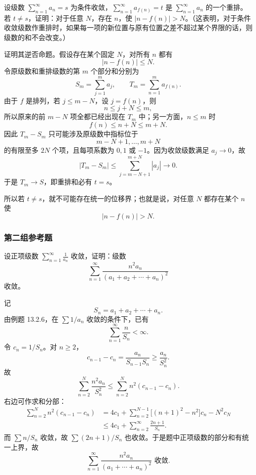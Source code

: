 \begin{xreferenceproblem}[20]
设级数 $\sum_{n=1}^{\infty}a_n=s$ 为条件收敛，$\sum_{n=1}^{\infty}a_{f(n)}=t$ 是 $\sum_{n=1}^{\infty}a_n$ 的一个重排。若 $t\neq s$，证明：对于任意 $N$，存在 $n$，使 $|n-f(n)|>N$。（这表明，对于条件收敛级数作重排时，如果每一项的新位置与原有位置之差不超过某个界限的话，则级数的和不会改变。）
\end{xreferenceproblem}
\begin{xsolution}
证明其逆否命题。假设存在某个固定 $N$，对所有 $n$ 都有
\[
 |n-f(n)|\leq N.
\]
令原级数和重排级数的第 $m$ 个部分和分别为
\[
 S_m=\sum_{j=1}^{m}a_j,
 \qquad
 T_m=\sum_{n=1}^{m}a_{f(n)}.
\]
由于 $f$ 是排列，若 $j\leq m-N$，设 $j=f(n)$，则
\[
 n\leq j+N\leq m,
\]
所以原来的前 $m-N$ 项全都已经出现在 $T_m$ 中；另一方面，$n\leq m$ 时
\[
 f(n)\leq n+N\leq m+N.
\]
因此 $T_m-S_m$ 只可能涉及原级数中指标位于
\[
 m-N+1,\ldots,m+N
\]
的有限至多 $2N$ 个项，且每项系数为 $0,1$ 或 $-1$。因为收敛级数满足 $a_j\to0$，故
\[
 |T_m-S_m|\leq\sum_{j=m-N+1}^{m+N}|a_j|\longrightarrow0.
\]
于是 $T_m\to S$，即重排和必有 $t=s$。

所以若 $t\neq s$，就不可能存在统一的位移界；也就是说，对任意 $N$ 都存在某个 $n$ 使
\[
 \boxed{|n-f(n)|>N}.
\]
\end{xsolution}


\subsubsection*{第二组参考题}

\begin{xreferenceproblem}[1]
设正项级数 $\sum_{n=1}^{\infty}\frac1{a_n}$ 收敛，证明：级数
\[
\sum_{n=1}^{\infty}\frac{n^2a_n}{(a_1+a_2+\cdots+a_n)^2}
\]
收敛。
\end{xreferenceproblem}
\begin{xsolution}
记
\[
 S_n=a_1+a_2+\cdots+a_n.
\]
由例题 13.2.6，在 $\sum1/a_n$ 收敛的条件下，已有
\[
 \sum_{n=1}^{\infty}\frac{n}{S_n}<\infty.
\]
令 $c_n=1/S_n$。对 $n\geq2$，
\[
 c_{n-1}-c_n
 =\frac{a_n}{S_{n-1}S_n}
 \geq\frac{a_n}{S_n^2}.
\]
故
\[
 \sum_{n=2}^{N}\frac{n^2a_n}{S_n^2}
 \leq\sum_{n=2}^{N}n^2(c_{n-1}-c_n).
\]
右边可作求和分部：
\[
 \begin{aligned}
 \sum_{n=2}^{N}n^2(c_{n-1}-c_n)
 &=4c_1+\sum_{n=2}^{N-1}\bigl[(n+1)^2-n^2\bigr]c_n-N^2c_N\\
 &\leq4c_1+\sum_{n=2}^{\infty}\frac{2n+1}{S_n}.
\end{aligned}
\]
而 $\sum n/S_n$ 收敛，故 $\sum(2n+1)/S_n$ 也收敛。于是题中正项级数的部分和有统一上界，故
\[
 \boxed{\sum_{n=1}^{\infty}\frac{n^2a_n}{(a_1+\cdots+a_n)^2}\text{ 收敛}.}
\]
\end{xsolution}


